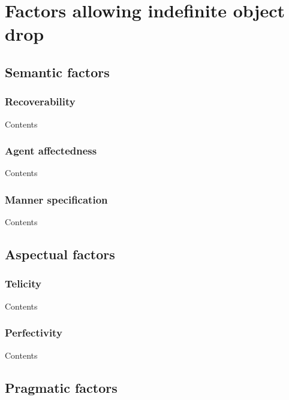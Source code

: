 \setchapterpreamble[u]{\margintoc}
\chapter{Factors allowing indefinite object drop}

\section{Semantic factors} 

\subsection{Recoverability} 

Contents

\subsection{Agent affectedness} 

Contents

\subsection{Manner specification} 

Contents


\section{Aspectual factors} 

\subsection{Telicity} 

Contents

\subsection{Perfectivity} 

Contents


\section{Pragmatic factors} 

